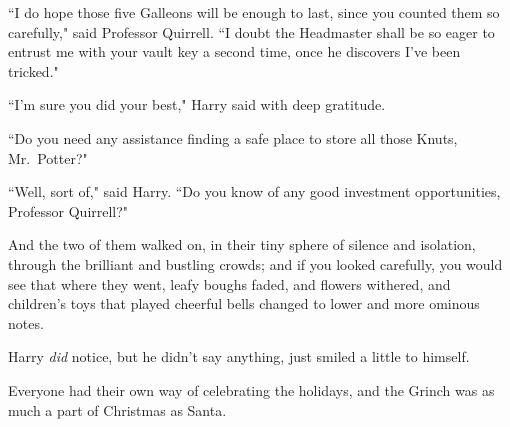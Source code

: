 ``I do hope those five Galleons will be enough to last, since you counted them so carefully," said Professor Quirrell. ``I doubt the Headmaster shall be so eager to entrust me with your vault key a second time, once he discovers I've been tricked."

``I'm sure you did your best," Harry said with deep gratitude.

``Do you need any assistance finding a safe place to store all those Knuts, Mr.~Potter?"

``Well, sort of," said Harry. ``Do you know of any good investment opportunities, Professor Quirrell?"

And the two of them walked on, in their tiny sphere of silence and isolation, through the brilliant and bustling crowds; and if you looked carefully, you would see that where they went, leafy boughs faded, and flowers withered, and children's toys that played cheerful bells changed to lower and more ominous notes.

Harry \emph{did} notice, but he didn't say anything, just smiled a little to himself.

Everyone had their own way of celebrating the holidays, and the Grinch was as much a part of Christmas as Santa.

